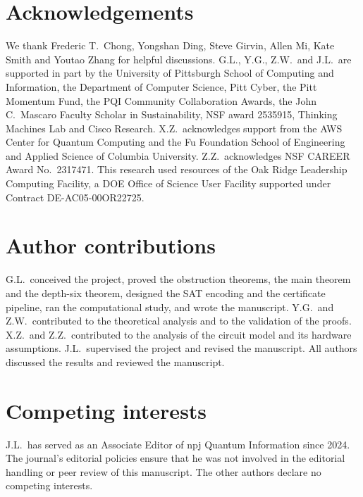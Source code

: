 \documentclass[reprint,twocolumn,superscriptaddress,nofootinbib]{revtex4-2}
\theoremstyle{plain}
\begin{document}
\section*{Acknowledgements}
We thank Frederic T.\ Chong, Yongshan Ding, Steve Girvin, Allen Mi, Kate
Smith and Youtao Zhang for helpful discussions. G.L., Y.G., Z.W.\ and
J.L.\ are supported in part by the University of Pittsburgh School of
Computing and Information, the Department of Computer Science, Pitt Cyber,
the Pitt Momentum Fund, the PQI Community Collaboration Awards, the John
C.\ Mascaro Faculty Scholar in Sustainability, NSF award 2535915, Thinking
Machines Lab and Cisco Research. X.Z.\ acknowledges support from the AWS
Center for Quantum Computing and the Fu Foundation School of Engineering
and Applied Science of Columbia University. Z.Z.\ acknowledges NSF CAREER
Award No.~2317471. This research used resources of the Oak Ridge
Leadership Computing Facility, a DOE Office of Science User Facility
supported under Contract DE-AC05-00OR22725.

\section*{Author contributions}
G.L.\ conceived the project, proved the obstruction theorems, the main
theorem and the depth-six theorem, designed the SAT encoding and the
certificate pipeline, ran the computational study, and wrote the
manuscript. Y.G.\ and Z.W.\ contributed to the theoretical analysis and to
the validation of the proofs. X.Z.\ and Z.Z.\ contributed to the analysis
of the circuit model and its hardware assumptions. J.L.\ supervised the
project and revised the manuscript. All authors discussed the results and
reviewed the manuscript.

\section*{Competing interests}
J.L.\ has served as an Associate Editor of npj Quantum Information since
2024. The journal's editorial policies ensure that he was not involved in
the editorial handling or peer review of this manuscript. The other
authors declare no competing interests.
\end{document}
